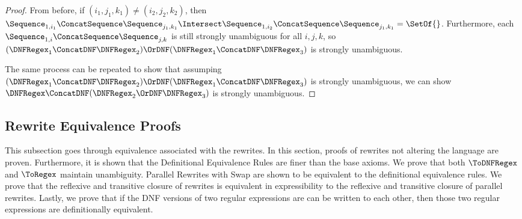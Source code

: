 \documentclass[acmsmall,screen]{acmart}
\begin{document}
\begin{proof}
  From before, if $(i_1,j_1,k_1) \neq (i_2,j_2,k_2)$, then
  $\Sequence_{1,i_1} \ConcatSequence \Sequence_{j_1,k_1} \Intersect
  \Sequence_{1,i_2} \ConcatSequence \Sequence_{j_1,k_1} = \SetOf{}$.
  Furthermore, each $\Sequence_{1,i} \ConcatSequence \Sequence_{j,k}$ is still
  strongly unambiguous for all $i,j,k$, so
  $(\DNFRegex_1 \ConcatDNF \DNFRegex_2) \OrDNF
  (\DNFRegex_1 \ConcatDNF \DNFRegex_3)$ is strongly unambiguous.

  The same process can be repeated to show that assumping
  $(\DNFRegex_1 \ConcatDNF \DNFRegex_2) \OrDNF
  (\DNFRegex_1 \ConcatDNF \DNFRegex_3)$ is strongly unambiguous, we can show
  $\DNFRegex \ConcatDNF (\DNFRegex_2 \OrDNF \DNFRegex_3)$ is strongly unambiguous.
\end{proof}


\subsection{Rewrite Equivalence Proofs}
\label{rewrite-proofs}

This subsection goes through equivalence associated with the rewrites.  In this
section, proofs of rewrites not altering the language are proven.  Furthermore,
it is shown that the Definitional Equivalence Rules are finer than the base
axioms.  We prove that both $\ToDNFRegex$ and $\ToRegex$ maintain unambiguity.
Parallel Rewrites with Swap are shown to be equivalent to the definitional
equivalence rules.
We prove that the reflexive and transitive closure of rewrites is equivalent in
expressibility to the reflexive and transitive closure of parallel rewrites.
Lastly, we prove that if the DNF versions of two regular expressions are can be
written to each other, then those two regular expressions are definitionally
equivalent.
\end{document}
